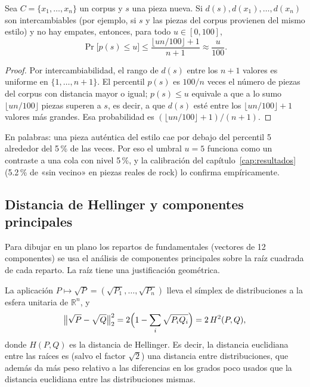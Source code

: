 \begin{proposicion}\label{prop:percentil}
Sea $C = \{x_1, \dots, x_n\}$ un corpus y $s$ una pieza nueva. Si $d(s), d(x_1), \dots, d(x_n)$ son intercambiables (por
ejemplo, si $s$ y las piezas del corpus provienen del mismo estilo) y no hay empates, entonces, para todo $u \in [0, 100]$,
\[
  \Pr\bigl[p(s) \le u\bigr] \le \frac{\lfloor u n / 100 \rfloor + 1}{n + 1} \approx \frac{u}{100}.
\]
\end{proposicion}

\begin{proof}
Por intercambiabilidad, el rango de $d(s)$ entre los $n + 1$ valores es uniforme en $\{1, \dots, n+1\}$. El percentil
$p(s)$ es $100/n$ veces el número de piezas del corpus con distancia mayor o igual; $p(s) \le u$ equivale a que a lo sumo
$\lfloor u n / 100 \rfloor$ piezas superen a $s$, es decir, a que $d(s)$ esté entre los $\lfloor u n / 100 \rfloor + 1$
valores más grandes. Esa probabilidad es $(\lfloor u n/100 \rfloor + 1)/(n + 1)$.
\end{proof}

En palabras: una pieza auténtica del estilo cae por debajo del percentil 5 alrededor del 5\,\% de las veces. Por eso el
umbral $u = 5$ funciona como un contraste a una cola con nivel 5\,\%, y la calibración del capítulo~\ref{cap:resultados}
(5.2\,\% de «sin vecino» en piezas reales de rock) lo confirma empíricamente.

\subsection{Distancia de Hellinger y componentes principales}

Para dibujar en un plano los repartos de fundamentales (vectores de 12 componentes) se usa el análisis de componentes
principales sobre la raíz cuadrada de cada reparto. La raíz tiene una justificación geométrica.

\begin{proposicion}\label{prop:hellinger}
La aplicación $P \mapsto \sqrt{P} = (\sqrt{P_1}, \dots, \sqrt{P_n})$ lleva el símplex de distribuciones a la esfera
unitaria de $\mathbb{R}^n$, y
\[
  \bigl\| \sqrt{P} - \sqrt{Q} \bigr\|_2^2 = 2 \Bigl(1 - \sum_i \sqrt{P_i Q_i}\Bigr) = 2\, H^2(P, Q),
\]
donde $H(P, Q)$ es la distancia de Hellinger. Es decir, la distancia euclidiana entre las raíces es (salvo el factor
$\sqrt2$) una distancia entre distribuciones, que además da más peso relativo a las diferencias en los grados poco usados
que la distancia euclidiana entre las distribuciones mismas.
\end{proposicion}

